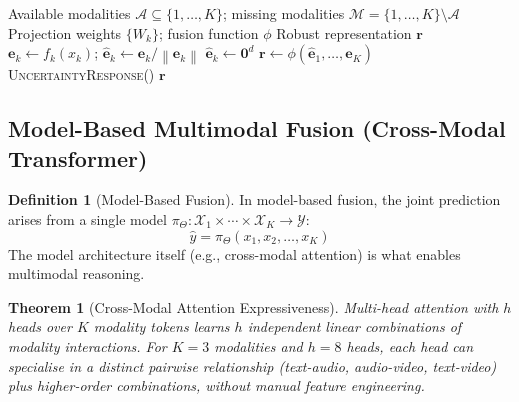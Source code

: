 \documentclass[12pt,a4paper]{article}
\theoremstyle{definition}
\newtheorem{definition}{Definition}[section]
\theoremstyle{plain}
\newtheorem{theorem}{Theorem}[section]
\theoremstyle{remark}
\newcommand{\Norm}[1]{\left\|#1\right\|}
\begin{document}
\begin{algorithm}[H]
\caption{Missing-Modality Robust Inference}
\label{alg:missing_modal}
\begin{algorithmic}[1]
\Require Available modalities $\mathcal{A} \subseteq \{1,\ldots,K\}$; missing modalities $\mathcal{M} = \{1,\ldots,K\}\setminus\mathcal{A}$
\Require Projection weights $\{W_k\}$; fusion function $\phi$
\Ensure Robust representation $\mathbf{r}$
    \State $\mathbf{e}_k \gets f_k(x_k)$; $\hat{\mathbf{e}}_k \gets \mathbf{e}_k / \Norm{\mathbf{e}_k}$
  \Else
    \State $\hat{\mathbf{e}}_k \gets \bm{0}^d$ 
  \EndIf
\EndFor
\State $\mathbf{r} \gets \phi(\hat{\mathbf{e}}_1, \ldots, \hat{\mathbf{e}}_K)$
  \State \Return \textsc{UncertaintyResponse}()
\EndIf
\State \Return $\mathbf{r}$
\end{algorithmic}
\end{algorithm}

\subsection{Model-Based Multimodal Fusion (Cross-Modal Transformer)}

\begin{definition}[Model-Based Fusion]
In model-based fusion, the joint prediction arises from a single model $\pi_\Theta : \mathcal{X}_1 \times \cdots \times \mathcal{X}_K \to \mathcal{Y}$:
\[
  \hat{y} = \pi_\Theta(x_1, x_2, \ldots, x_K)
\]
The model architecture itself (e.g., cross-modal attention) is what enables multimodal reasoning.
\end{definition}

\begin{theorem}[Cross-Modal Attention Expressiveness]
Multi-head attention with $h$ heads over $K$ modality tokens learns $h$ independent linear combinations of modality interactions. For $K=3$ modalities and $h=8$ heads, each head can specialise in a distinct pairwise relationship (text-audio, audio-video, text-video) plus higher-order combinations, without manual feature engineering.
\end{theorem}
\end{document}
